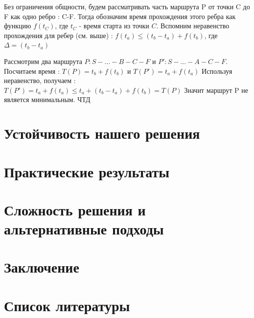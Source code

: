\documentclass[12pt, a4paper]{article}
\begin{document}
Без ограничения общности, будем рассматривать часть маршрута P от точки C до F как одно ребро : C-F. Тогда обозначим время прохождения этого ребра как функцию $f(t_C)$, где $t_C$ - время старта из точки $C$. Вспомним неравенство прохождения для ребер (см. выше) : $f(t_a) \le (t_b - t_a) + f(t_b)$, где $\Delta = (t_b - t_a)$

Рассмотрим два маршрута $P : S-...-B-C-F$ и $P': S-...-A-C-F$.
Посчитаем время : $T(P) = t_b + f(t_b)$  и $T(P') = t_a + f(t_a)$
Используя неравенство, получаем : $T(P') = t_a + f(t_a) \le t_a + (t_b - t_a) + f(t_b) = T(P)$ Значит маршрут P не является минимальным. ЧТД


\newpage
\section*{Устойчивость нашего решения}



\newpage
\section*{Практические результаты}


\newpage
\section*{Сложность решения и альтернативные подходы}

\newpage
\section*{Заключение}

\newpage
\section*{Список литературы}
\end{document}
